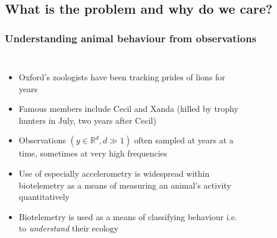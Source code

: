 \documentclass[aspectratio=169]{beamer}
\begin{document}
\begin{frame}[plain]
    \subsection{What is the problem and why do we care?}
    \frametitle{Understanding animal behaviour from observations} 
    \begin{columns}[t] %


        \begin{itemize}
            \small
        \item Oxford's zoologists have been tracking prides of lions for years 
        \item Famous members include Cecil and Xanda (killed by trophy hunters in July, two years after Cecil)
        \item Observations $(y \in \mathbb{R}^d, d\gg1)$ often sampled at years at a time, sometimes at very high frequencies 
        \item Use of especially accelerometry is widespread within biotelemetry as a means of measuring an animal’s activity quantitatively
        \item Biotelemetry is used as a means of classifying behaviour i.e. to \emph{understand} their ecology
    \end{itemize}

    \vspace{-2em}
    \begin{figure}[ht]
        \\[-0em]
    \end{figure}
\end{columns}
\end{frame}
\end{document}
